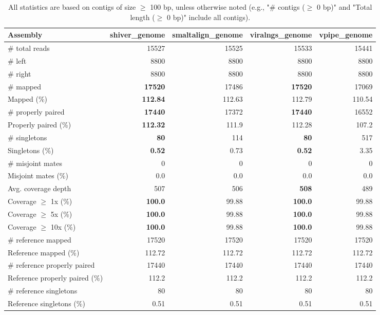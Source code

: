 \documentclass[12pt,a4paper]{article}
\begin{document}
\begin{table}[ht]
\begin{center}
\caption{All statistics are based on contigs of size $\geq$ 100 bp, unless otherwise noted (e.g., "\# contigs ($\geq$ 0 bp)" and "Total length ($\geq$ 0 bp)" include all contigs).}
\begin{tabular}{|l*{4}{|r}|}
\hline
Assembly & shiver\_genome & smaltalign\_genome & viralngs\_genome & vpipe\_genome \\ \hline
\# total reads & 15527 & 15525 & 15533 & 15441 \\ \hline
\# left & 8800 & 8800 & 8800 & 8800 \\ \hline
\# right & 8800 & 8800 & 8800 & 8800 \\ \hline
\# mapped & {\bf 17520} & 17486 & {\bf 17520} & 17069 \\ \hline
Mapped (\%) & {\bf 112.84} & 112.63 & 112.79 & 110.54 \\ \hline
\# properly paired & {\bf 17440} & 17372 & {\bf 17440} & 16552 \\ \hline
Properly paired (\%) & {\bf 112.32} & 111.9 & 112.28 & 107.2 \\ \hline
\# singletons & {\bf 80} & 114 & {\bf 80} & 517 \\ \hline
Singletons (\%) & {\bf 0.52} & 0.73 & {\bf 0.52} & 3.35 \\ \hline
\# misjoint mates & 0 & 0 & 0 & 0 \\ \hline
Misjoint mates (\%) & 0.0 & 0.0 & 0.0 & 0.0 \\ \hline
Avg. coverage depth & 507 & 506 & {\bf 508} & 489 \\ \hline
Coverage $\geq$ 1x (\%) & {\bf 100.0} & 99.88 & {\bf 100.0} & 99.88 \\ \hline
Coverage $\geq$ 5x (\%) & {\bf 100.0} & 99.88 & {\bf 100.0} & 99.88 \\ \hline
Coverage $\geq$ 10x (\%) & {\bf 100.0} & 99.88 & {\bf 100.0} & 99.88 \\ \hline
\# reference mapped & 17520 & 17520 & 17520 & 17520 \\ \hline
Reference mapped (\%) & 112.72 & 112.72 & 112.72 & 112.72 \\ \hline
\# reference properly paired & 17440 & 17440 & 17440 & 17440 \\ \hline
Reference properly paired (\%) & 112.2 & 112.2 & 112.2 & 112.2 \\ \hline
\# reference singletons & 80 & 80 & 80 & 80 \\ \hline
Reference singletons (\%) & 0.51 & 0.51 & 0.51 & 0.51 \\ \hline

\end{tabular}
\end{center}
\end{table}
\end{document}
